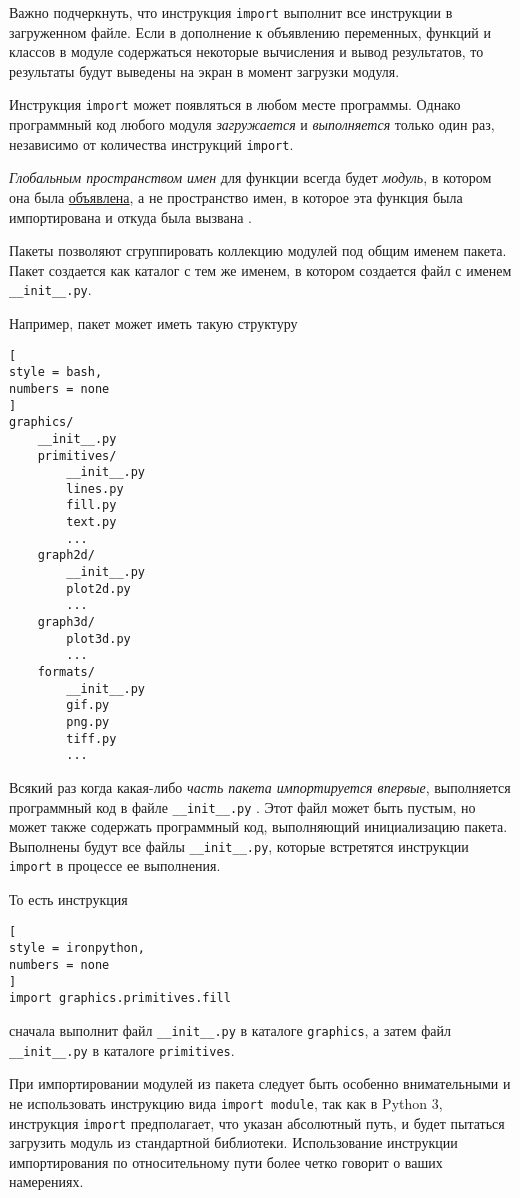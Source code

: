 \documentclass[%
	11pt,
	a4paper,
	utf8,
		]{article}
\begin{document}
Важно подчеркнуть, что инструкция \texttt{import} выполнит все инструкции в загруженном файле. Если в дополнение к объявлению переменных, функций и классов в модуле содержаться некоторые вычисления и вывод результатов, то результаты будут выведены на экран в момент загрузки модуля.

Инструкция \texttt{import} может появляться в любом месте программы. Однако программный код любого модуля \emph{загружается} и \emph{выполняется} только один раз, независимо от количества инструкций \texttt{import}. 

\emph{Глобальным пространством имен} для функции всегда будет \emph{модуль}, в котором она была \underline{объявлена}, а не пространство имен, в которое эта функция была импортирована и откуда была вызвана \cite[]{beazley:python-2010}.

Пакеты позволяют сгруппировать коллекцию модулей под общим именем пакета. Пакет создается как каталог с тем же именем, в котором создается файл с именем \verb|__init__.py|.

Например, пакет может иметь такую структуру
\begin{lstlisting}[
style = bash,
numbers = none
]
graphics/
    __init__.py
    primitives/
        __init__.py
        lines.py
        fill.py
        text.py
        ...
    graph2d/
        __init__.py
        plot2d.py
        ...
    graph3d/
        plot3d.py
        ...
    formats/
        __init__.py
        gif.py
        png.py
        tiff.py
        ...
\end{lstlisting}

Всякий раз когда какая-либо \emph{часть пакета импортируется впервые}, выполняется программный код в файле \verb|__init__.py| \cite[]{beazley:python-2010}. Этот файл может быть пустым, но может также содержать программный код, выполняющий инициализацию пакета. Выполнены будут все файлы \verb|__init__.py|, которые встретятся инструкции \texttt{import} в процессе ее выполнения.

То есть инструкция
\begin{lstlisting}[
style = ironpython,
numbers = none
]
import graphics.primitives.fill
\end{lstlisting}
сначала выполнит файл \verb|__init__.py| в каталоге \texttt{graphics}, а затем файл \verb|__init__.py| в каталоге \texttt{primitives}.

При импортировании модулей из пакета следует быть особенно внимательными и не использовать инструкцию вида \texttt{import module}, так как в Python 3, инструкция \texttt{import} предполагает, что указан абсолютный путь, и будет пытаться загрузить модуль из стандартной библиотеки. Использование инструкции импортирования по относительному пути более четко говорит о ваших намерениях.
\end{document}
